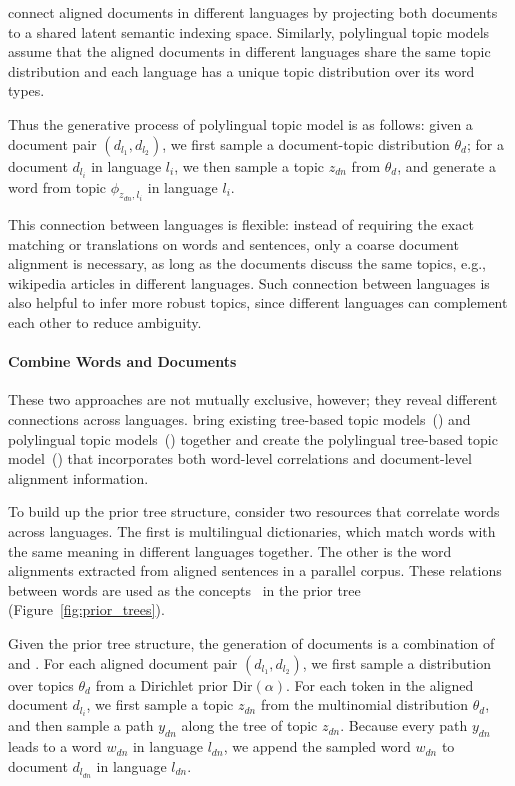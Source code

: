\citet{Landauer-1990} connect aligned documents in different languages by projecting both documents to a shared latent semantic indexing space. Similarly, polylingual topic models~\citep[\plda{}]{mimno-09} assume that the aligned documents in different languages share the same topic distribution and each language has a unique topic distribution over its word types.

Thus the generative process of polylingual topic model is as follows: given a document pair $(d_{l_1}, d_{l_2})$, we first sample a document-topic distribution $\theta_d$; for a document $d_{l_i}$ in language $l_i$, we then sample a topic $z_{dn}$ from $\theta_d$, and generate a word from topic $\phi_{z_{dn}, l_i}$ in language $l_i$. 

This connection between languages is flexible: instead of requiring the exact matching or translations on words and sentences, only a coarse document alignment is necessary, as long as the documents discuss the same topics, e.g., wikipedia articles in different languages. Such connection between languages is also helpful to infer more robust topics, since different languages can complement each other to reduce ambiguity. 


\paragraph{\bf Combine Words and Documents}

These two approaches are not mutually exclusive, however; they reveal different connections across languages. \citet{hu-14} bring existing tree-based topic models~(\tlda{}) and polylingual topic models~(\plda{}) together and create the polylingual tree-based topic model~(\ptlda{}) that incorporates both word-level correlations and document-level alignment information. 

To build up the prior tree structure, \citet{hu-14} consider two resources that correlate words across languages. The first is multilingual dictionaries, which match words with the same meaning in different languages together. The other is the word alignments extracted from aligned sentences in a parallel corpus. These relations between words are used as the concepts~\citep{Bhattacharya-2006} in the prior tree (Figure~\ref{fig:prior_trees}).

Given the prior tree structure, the generation of documents is a combination of \tlda{} and \plda{}.  For each aligned document pair $(d_{l_1}, d_{l_2})$, we first sample a distribution over topics $\theta_d$ from a Dirichlet prior $\text{Dir}(\alpha)$.  For each token in the aligned document $d_{l_i}$, we first sample a topic $z_{dn}$ from the multinomial distribution $\theta_d$, and then sample a path $y_{dn}$ along the tree of topic $z_{dn}$. Because every path $y_{dn}$ leads to a word $w_{dn}$ in language $l_{dn}$, we append the sampled word $w_{dn}$ to document $d_{l_{dn}}$ in language $l_{dn}$. 

